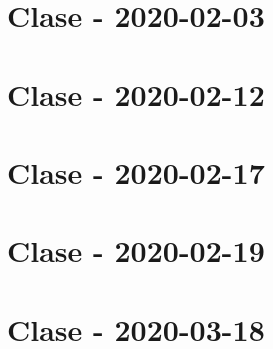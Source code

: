 \documentclass[openany]{book}
\begin{document}
\chapter{Clase - 2020-02-03}


\chapter{Clase - 2020-02-12}



\chapter{Clase - 2020-02-17}


\chapter{Clase - 2020-02-19}


\chapter{Clase - 2020-03-18}

\end{document}
